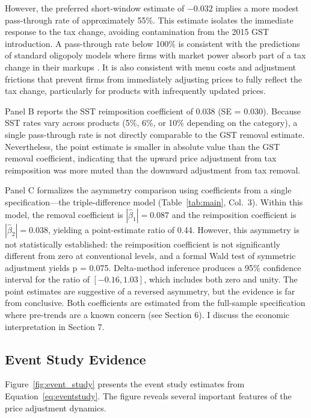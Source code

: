 \documentclass[12pt]{article}
\begin{document}
However, the preferred short-window estimate of $-0.032$ implies a more modest pass-through rate of approximately 55\%. This estimate isolates the immediate response to the tax change, avoiding contamination from the 2015 GST introduction. A pass-through rate below 100\% is consistent with the predictions of standard oligopoly models where firms with market power absorb part of a tax change in their markups \citep{weyl2013}. It is also consistent with menu costs and adjustment frictions that prevent firms from immediately adjusting prices to fully reflect the tax change, particularly for products with infrequently updated prices.

Panel B reports the SST reimposition coefficient of $0.038$ (SE = 0.030). Because SST rates vary across products (5\%, 6\%, or 10\% depending on the category), a single pass-through rate is not directly comparable to the GST removal estimate. Nevertheless, the point estimate is smaller in absolute value than the GST removal coefficient, indicating that the upward price adjustment from tax reimposition was more muted than the downward adjustment from tax removal.

Panel C formalizes the asymmetry comparison using coefficients from a single specification---the triple-difference model (Table~\ref{tab:main}, Col.\ 3). Within this model, the removal coefficient is $|\hat{\beta}_1| = 0.087$ and the reimposition coefficient is $|\hat{\beta}_2| = 0.038$, yielding a point-estimate ratio of 0.44. However, this asymmetry is not statistically established: the reimposition coefficient is not significantly different from zero at conventional levels, and a formal Wald test of symmetric adjustment yields p = 0.075. Delta-method inference produces a 95\% confidence interval for the ratio of $[-0.16, 1.03]$, which includes both zero and unity. The point estimates are suggestive of a reversed asymmetry, but the evidence is far from conclusive. Both coefficients are estimated from the full-sample specification where pre-trends are a known concern (see Section 6). I discuss the economic interpretation in Section 7.



\subsection{Event Study Evidence}

Figure~\ref{fig:event_study} presents the event study estimates from Equation~\ref{eq:eventstudy}. The figure reveals several important features of the price adjustment dynamics.
\end{document}
